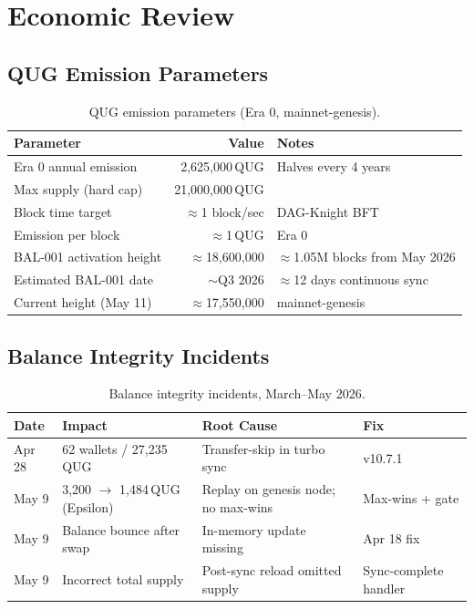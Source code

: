 \documentclass[12pt,a4paper]{article}
\begin{document}
\section{Economic Review}

\subsection{QUG Emission Parameters}

\begin{table}[H]
\centering
\small
\begin{tabularx}{0.85\linewidth}{lrX}
\toprule
\textbf{Parameter} & \textbf{Value} & \textbf{Notes} \\
\midrule
Era 0 annual emission & 2,625,000\,QUG & Halves every 4 years \\
Max supply (hard cap) & 21,000,000\,QUG & \\
Block time target & $\approx$1 block/sec & DAG-Knight BFT \\
Emission per block & $\approx$1\,QUG & Era 0 \\
BAL-001 activation height & $\approx$18,600,000 & $\approx$1.05M blocks from May 2026 \\
Estimated BAL-001 date & $\sim$Q3 2026 & $\approx$12 days continuous sync \\
Current height (May 11) & $\approx$17,550,000 & mainnet-genesis \\
\bottomrule
\end{tabularx}
\caption{QUG emission parameters (Era 0, mainnet-genesis).}
\end{table}

\subsection{Balance Integrity Incidents}

\begin{table}[H]
\centering
\small
\begin{tabularx}{\linewidth}{llXl}
\toprule
\textbf{Date} & \textbf{Impact} & \textbf{Root Cause} & \textbf{Fix} \\
\midrule
Apr 28 & 62 wallets / 27,235\,QUG & Transfer-skip in turbo sync & v10.7.1 \\
\rowcolor{rowgray}
May 9 & 3,200 $\to$ 1,484\,QUG (Epsilon) & Replay on genesis node; no max-wins & Max-wins + gate \\
May 9 & Balance bounce after swap & In-memory update missing & Apr 18 fix \\
\rowcolor{rowgray}
May 9 & Incorrect total supply & Post-sync reload omitted supply & Sync-complete handler \\
\bottomrule
\end{tabularx}
\caption{Balance integrity incidents, March--May 2026.}
\end{table}
\end{document}
